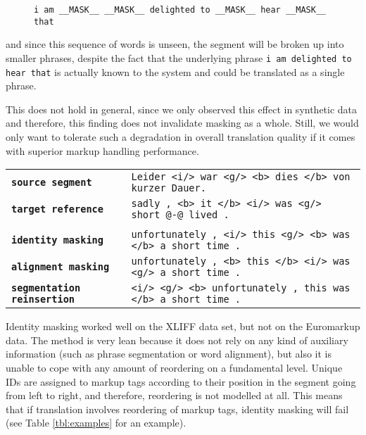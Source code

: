 \documentclass[11pt,letterpaper]{article}
\begin{document}
\begin{figure}[h]
\texttt{i am \_\_MASK\_\_ \_\_MASK\_\_ delighted to \_\_MASK\_\_ hear \_\_MASK\_\_ that}
\end{figure}

\noindent and since this sequence of words is unseen, the segment will be broken up into smaller phrases, despite the fact that the underlying phrase \texttt{i am delighted to hear that} is actually known to the system and could be translated as a single phrase.


This does not hold in general, since we only observed this effect in synthetic data and therefore, this finding does not invalidate masking as a whole. Still, we would only want to tolerate such a degradation in overall translation quality if it comes with superior markup handling performance.

\begin{table*}
\small
\begin{tabular}{l  p{12cm}}
\texttt{\textbf{source segment}} & \texttt{Leider <i/> war <g/> <b> dies </b> von kurzer Dauer.} \\
\texttt{\textbf{target reference}} & \texttt{sadly , <b> it </b> <i/> was <g/> short @-@ lived .} \\
& \\
\texttt{\textbf{identity masking}} & \texttt{unfortunately , <i/> this <g/> <b> was </b> a short time .} \\
\texttt{\textbf{alignment masking}} & \texttt{unfortunately , <b> this </b> <i/> was <g/> a short time .} \\
\texttt{\textbf{segmentation reinsertion}} & \texttt{<i/> <g/> <b> unfortunately , this was </b> a short time .}
\end{tabular}
\caption{Examples of markup handling that show 1) the inability of identity masking to deal properly with markup that needs reordering and 2) that segmentation reinsertion can only insert markup at phrase boundaries.} \label{tbl:examples}
\end{table*}

Identity masking worked well on the XLIFF data set, but not on the Euromarkup data. The method is very lean because it does not rely on any kind of auxiliary information (such as phrase segmentation or word alignment), but also it is unable to cope with any amount of reordering on a fundamental level. Unique IDs are assigned to markup tags according to their position in the segment going from left to right, and therefore, reordering is not modelled at all. This means that if translation involves reordering of markup tags, identity masking will fail (see Table \ref{tbl:examples} for an example).
\end{document}
